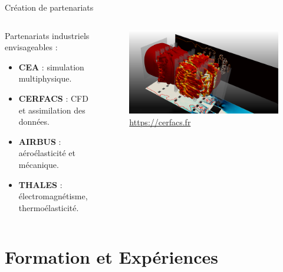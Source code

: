 \documentclass[aspectratio=169, french]{beamer}
\begin{document}
\begin{frame}{Création de partenariats}	

	\begin{columns}
		\begin{column}{.5\textwidth}
			Partenariats industriels envisageables : 
			\begin{itemize}
				\item \textbf{CEA} : simulation multiphysique.
				\item \textbf{CERFACS} : CFD et assimilation des données. 
				\item \textbf{AIRBUS} : aéroélasticité et mécanique.
				\item \textbf{THALES} : électromagnétisme, thermoélasticité.
			\end{itemize}
		\end{column}
		\begin{column}{.43\textwidth}
			\begin{figure}
				\includegraphics[width=1\textwidth]{image_CERFACS.png}
				\caption{\href{https://cerfacs.fr/logiciels-de-simulation-pour-la-mecanique-des-fluides/}{https://cerfacs.fr}}
			\end{figure}	
		\end{column}
	\end{columns}
	
\end{frame}




\begin{frame}{}

\end{frame}

\appendix

\section{Formation et Expériences}
\end{document}
